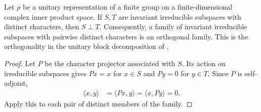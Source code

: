 \begin{lemma}%
    \label{lem:peps_unitary_irreducible_sectors_orthogonal}
    \leanok
    Let $\rho$ be a unitary representation of a finite group on a
    finite-dimensional complex inner product space. If $S,T$ are invariant
    irreducible subspaces with distinct characters, then $S\perp T$.
    Consequently, a family of invariant irreducible subspaces with pairwise
    distinct characters is an orthogonal family.
    This is the orthogonality in the unitary block decomposition of
    \cite[Lemma~4.4 and Section~7]{Schuch2010PEPS}.
\end{lemma}
\begin{proof}\leanok
    Let $P$ be the character projector associated with $S$. Its action on
    irreducible subspaces gives $Px=x$ for $x\in S$ and $Py=0$ for $y\in T$.
    Since $P$ is self-adjoint,
    \begin{align}
        \langle x,y\rangle
         & =\langle Px,y\rangle
        =\langle x,Py\rangle=0.
    \end{align}
    Apply this to each pair of distinct members of the family.
\end{proof}
